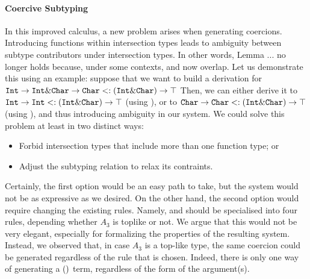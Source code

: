 
\paragraph{Coercive Subtyping}

In this improved calculus, a new problem arises when generating coercions. 
Introducing functions within intersection types leads to ambiguity between subtype contributors 
under intersection types.
In other words, Lemma ... no longer holds because, under some contexts, 
 and  now overlap. 
Let us demonstrate this using an example:
suppose that we want to build a derivation for  
$\texttt{Int} \to \texttt{Int} \& \texttt{Char} \to \texttt{Char} <: (\texttt{Int} \& \texttt{Char}) \to \top$
Then, we can either derive it to $\texttt{Int} \to \texttt{Int} <: (\texttt{Int} \& \texttt{Char}) \to \top$ 
(using ), or to $\texttt{Char} \to \texttt{Char} <: (\texttt{Int} \& \texttt{Char}) \to \top$
(using ), and thus introducing ambiguity in our system.
We could solve this problem at least in two distinct ways:

\begin{itemize}
\item Forbid intersection types that include more than one function type; or
\item Adjust the subtyping relation to relax its contraints. 
\end{itemize}

Certainly, the first option would be an easy path to take, but the system would not be as expressive as we desired.
On the other hand, the second option would require changing the existing rules.
Namely,  and  should be specialised into four rules, depending
whether $A_3$ is toplike or not.
We argue that this would not be very elegant, especially for formalizing the properties of the resulting system.
Instead, we observed that, in case $A_3$ is a top-like type, the same coercion could be generated regardless of 
the rule that is chosen.
Indeed, there is only one way of generating a $()$ term, regardless of the form of the argument(s).

